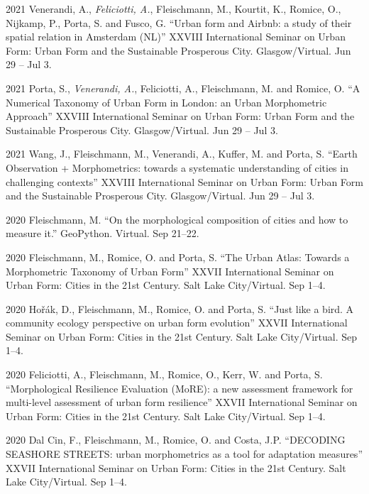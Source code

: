 \documentclass[12pt,a4paper]{report}
\begin{document}
\begin{tablist}
        \item[2021] \tab{}Venerandi, A., \textit{Feliciotti, A.}, Fleischmann, M., Kourtit, K., Romice, O., Nijkamp, P., Porta, S. and Fusco, G. \enquote{Urban form and Airbnb: a study of their spatial relation in Amsterdam (NL)} XXVIII International Seminar on Urban Form: Urban Form and the Sustainable Prosperous City. Glasgow/Virtual. \@ Jun 29 -- Jul 3.

        \item[2021] \tab{}Porta, S., \textit{Venerandi, A.}, Feliciotti, A., Fleischmann, M. and Romice, O. \enquote{A Numerical Taxonomy of Urban Form in London: an Urban Morphometric Approach} XXVIII International Seminar on Urban Form: Urban Form and the Sustainable Prosperous City. Glasgow/Virtual. \@ Jun 29 -- Jul 3.

        \item[2021] \tab{}Wang, J., Fleischmann, M., Venerandi, A., Kuffer, M. and Porta, S. \enquote{Earth Observation + Morphometrics: towards a systematic understanding of cities in challenging contexts} XXVIII International Seminar on Urban Form: Urban Form and the Sustainable Prosperous City. Glasgow/Virtual. \@ Jun 29 -- Jul 3.

        \item[2020] \tab{}Fleischmann, M. \enquote{On the morphological composition of cities and how to measure it.} GeoPython. Virtual. \@ Sep 21--22.

        \item[2020] \tab{}Fleischmann, M., Romice, O. and Porta, S. \enquote{The Urban Atlas: Towards a Morphometric Taxonomy of Urban Form} XXVII International Seminar on Urban Form: Cities in the 21st Century. Salt Lake City/Virtual. \@ Sep 1--4.

        \item[2020] \tab{}Hořák, D., Fleischmann, M., Romice, O. and Porta, S. \enquote{Just like a bird. A community ecology perspective on urban form evolution} XXVII International Seminar on Urban Form: Cities in the 21st Century. Salt Lake City/Virtual. \@ Sep 1--4.

        \item[2020] \tab{}Feliciotti, A., Fleischmann, M., Romice, O., Kerr, W. and Porta, S. \enquote{Morphological Resilience Evaluation (MoRE): a new assessment framework for multi-level assessment of urban form resilience} XXVII International Seminar on Urban Form: Cities in the 21st Century. Salt Lake City/Virtual. \@ Sep 1--4.

        \item[2020] \tab{}Dal Cin, F., Fleischmann, M., Romice, O. and Costa, J.P. \enquote{DECODING SEASHORE STREETS: urban morphometrics as a tool for adaptation measures} XXVII International Seminar on Urban Form: Cities in the 21st Century. Salt Lake City/Virtual. \@ Sep 1--4.


\end{tablist}
\end{document}
